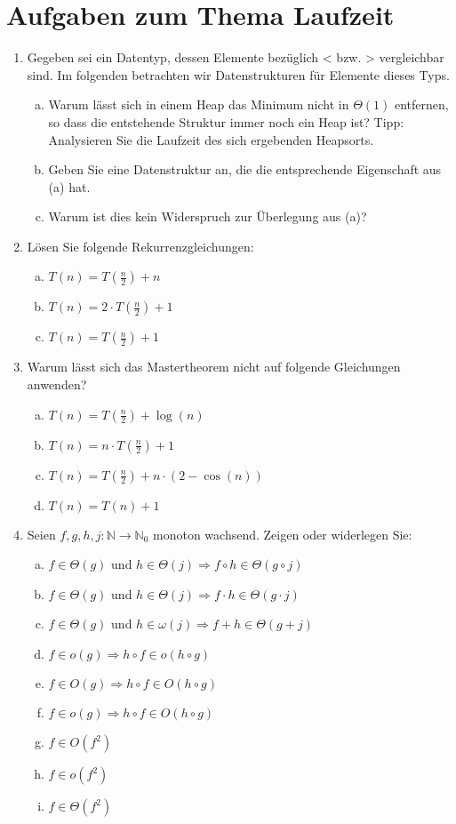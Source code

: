 \documentclass{scrartcl}
\begin{document}
\section*{Aufgaben zum Thema Laufzeit}
\begin{enumerate}[(1)]

\item Gegeben sei ein Datentyp, dessen Elemente bez\"uglich < bzw. > vergleichbar sind. Im folgenden betrachten wir Datenstrukturen f\"ur Elemente dieses Typs.
\begin{enumerate}[(a)]
\item Warum l\"asst sich in einem Heap das Minimum nicht in $\Theta(1)$ entfernen, so dass die entstehende Struktur immer noch ein Heap ist? \newline
Tipp: Analysieren Sie die Laufzeit des sich ergebenden Heapsorts.
\item Geben Sie eine Datenstruktur an, die die entsprechende Eigenschaft aus (a) hat.
\item Warum ist dies kein Widerspruch zur \"Uberlegung aus (a)?
\end{enumerate}

\item L\"osen Sie folgende Rekurrenzgleichungen:
\begin{enumerate}[(a)]
\item $T(n)=T(\frac{n}{2})+n$
\item $T(n)=2\cdot T(\frac{n}{2})+1$
\item $T(n)=T(\frac{n}{2})+1$
\end{enumerate}

\item Warum l\"asst sich das Mastertheorem nicht auf folgende Gleichungen anwenden?
\begin{enumerate}[(a)]
\item $T(n)=T(\frac{n}{2})+\log(n)$
\item $T(n)=n\cdot T(\frac{n}{2})+1$
\item $T(n)=T(\frac{n}{2})+n\cdot(2-\cos(n))$
\item $T(n)=T(n)+1$
\end{enumerate}

\item Seien $f,g,h,j: \mathbb{N}\to\mathbb{N}_0$ monoton wachsend. Zeigen oder widerlegen Sie:
\begin{enumerate}[(a)]
\item $f\in\Theta(g)$ und $h\in\Theta(j)\Rightarrow f\circ h \in \Theta(g\circ j)$
\item $f\in\Theta(g)$ und $h\in\Theta(j)\Rightarrow f\cdot h \in \Theta(g\cdot j)$
\item $f\in\Theta(g)$ und $h\in\omega(j)\Rightarrow f + h \in \Theta(g + j)$
\item $f\in o(g)\Rightarrow h\circ f \in o(h\circ g)$
\item $f\in O(g)\Rightarrow h\circ f \in O(h\circ g)$
\item $f\in o(g)\Rightarrow h\circ f \in O(h\circ g)$
\item $f\in O(f^2)$
\item $f\in o(f^2)$
\item $f\in \Theta(f^2)$
\end{enumerate}

\end{enumerate}
\end{document}
